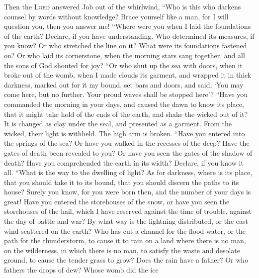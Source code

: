  Then the \textsc{Lord} answered Job out of the whirlwind,
 ``Who is this who darkens counsel by words without
knowledge?  Brace yourself like a man, for I will question
you, then you answer me!  ``Where were you when I laid the
foundations of the earth? Declare, if you have understanding.
 Who determined its measures, if you know? Or who
stretched the line on it?  What were its foundations
fastened on? Or who laid its cornerstone,  when the
morning stars sang together, and all the sons of God shouted for joy?
 ``Or who shut up the sea with doors, when it broke out of
the womb,  when I made clouds its garment, and wrapped it
in thick darkness,  marked out for it my bound, set bars
and doors,  and said, `You may come here, but no further.
Your proud waves shall be stopped here'?  ``Have you
commanded the morning in your days, and caused the dawn to know its
place,  that it might take hold of the ends of the earth,
and shake the wicked out of it?  It is changed as clay
under the seal, and presented as a garment.  From the
wicked, their light is withheld. The high arm is broken. 
``Have you entered into the springs of the sea? Or have you walked in
the recesses of the deep?  Have the gates of death been
revealed to you? Or have you seen the gates of the shadow of death?
 Have you comprehended the earth in its width? Declare,
if you know it all.  ``What is the way to the dwelling of
light? As for darkness, where is its place,  that you
should take it to its bound, that you should discern the paths to its
house?  Surely you know, for you were born then, and the
number of your days is great!  Have you entered the
storehouses of the snow, or have you seen the storehouses of the hail,
 which I have reserved against the time of trouble,
against the day of battle and war?  By what way is the
lightning distributed, or the east wind scattered on the earth?
 Who has cut a channel for the flood water, or the path
for the thunderstorm,  to cause it to rain on a land
where there is no man, on the wilderness, in which there is no man,
 to satisfy the waste and desolate ground, to cause the
tender grass to grow?  Does the rain have a father? Or
who fathers the drops of dew?  Whose womb did the ice
